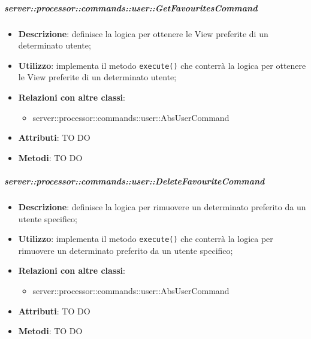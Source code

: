         \subparagraph{server::processor::commands::user::GetFavouritesCommand} %
        \label{subp:bdsm_app_server_processor_commands_user_getfavouritescommand}
        \begin{itemize}
          \item \textbf{Descrizione}: definisce la logica per ottenere le View preferite di un determinato utente;
          \item \textbf{Utilizzo}: implementa il metodo \texttt{execute()} che conterrà la logica per ottenere le View preferite di un determinato utente;
          \item \textbf{Relazioni con altre classi}:
            \begin{itemize}
              \item server::processor::commands::user::AbsUserCommand
            \end{itemize}
			\item \textbf{Attributi}: TO DO
			\item \textbf{Metodi}: TO DO
        \end{itemize}

        \subparagraph{server::processor::commands::user::DeleteFavouriteCommand} %
        \label{subp:bdsm_app_server_processor_commands_user_deletefavouritecommand}
        \begin{itemize}
          \item \textbf{Descrizione}: definisce la logica per rimuovere un determinato preferito da un utente specifico;
          \item \textbf{Utilizzo}: implementa il metodo \texttt{execute()} che conterrà la logica per rimuovere un determinato preferito da un utente specifico;
          \item \textbf{Relazioni con altre classi}:
            \begin{itemize}
              \item server::processor::commands::user::AbsUserCommand
            \end{itemize}
			\item \textbf{Attributi}: TO DO
			\item \textbf{Metodi}: TO DO
        \end{itemize}

